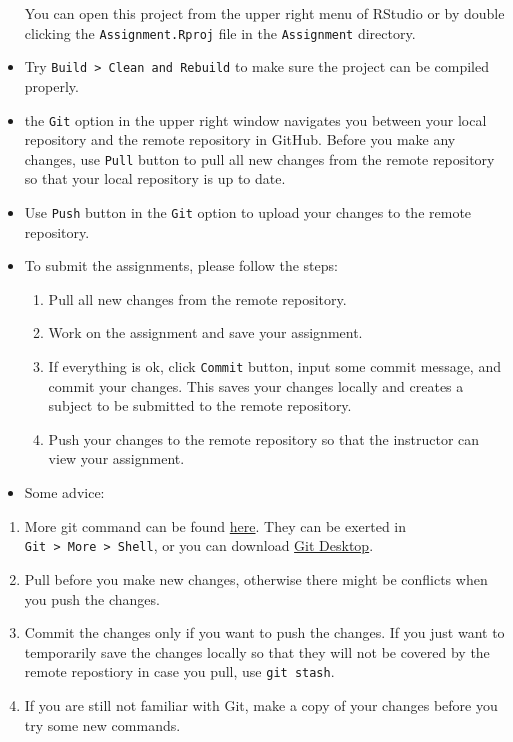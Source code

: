 \documentclass[
]{book}
\providecommand{\tightlist}{%
  \setlength{\itemsep}{0pt}\setlength{\parskip}{0pt}}
\begin{document}
\begin{itemize}
  You can open this project from the upper right menu of RStudio or by double clicking the \texttt{Assignment.Rproj} file in the \texttt{Assignment} directory.
\item
  Try \texttt{Build\ \textgreater{}\ Clean\ and\ Rebuild} to make sure the project can be compiled properly.
\item
  the \texttt{Git} option in the upper right window navigates you between your local repository and the remote repository in GitHub. Before you make any changes, use \texttt{Pull} button to pull all new changes from the remote repository so that your local repository is up to date.
\item
  Use \texttt{Push} button in the \texttt{Git} option to upload your changes to the remote repository.
\item
  To submit the assignments, please follow the steps:

  \begin{enumerate}
  \def\labelenumi{\arabic{enumi}.}
  \tightlist
  \item
    Pull all new changes from the remote repository.
  \item
    Work on the assignment and save your assignment.
  \item
    If everything is ok, click \texttt{Commit} button, input some commit message, and commit your changes. This saves your changes locally and creates a subject to be submitted to the remote repository.
  \item
    Push your changes to the remote repository so that the instructor can view your assignment.
  \end{enumerate}
\item
  Some advice:
\end{itemize}

\begin{enumerate}
\def\labelenumi{\arabic{enumi}.}
\tightlist
\item
  More git command can be found \href{https://docs.github.com/en/github/using-git}{here}. They can be exerted in \texttt{Git\ \textgreater{}\ More\ \textgreater{}\ Shell}, or you can download \href{https://git-scm.com/download/win}{Git Desktop}.
\item
  Pull before you make new changes, otherwise there might be conflicts when you push the changes.\\
\item
  Commit the changes only if you want to push the changes. If you just want to temporarily save the changes locally so that they will not be covered by the remote repostiory in case you pull, use \texttt{git\ stash}.
\item
  If you are still not familiar with Git, make a copy of your changes before you try some new commands.
\end{enumerate}
\end{document}
